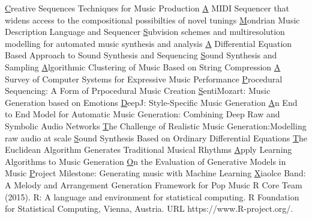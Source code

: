 \begin{frame}[t]
\begin{columns}[t]
\begin{column}{\onecolwid}
\begin{thebibliography}{00}
\footnotesize		 
{}\href{}Creative Sequences Techniques for Music Production
\href{}A MIDI Sequencer that widens access to the compositional possibilties of novel tunings
\href{}Mondrian Music Description Language and Sequencer
\href{}Subvision schemes and multiresolution modelling for automated music synthesis and analysis
\href{}A Differential Equation Based Approach to Sound Synthesis and Sequencing
\href{}Sound Synthesis and Sampling
\href{}Algorithmic Clustering of Music Based on String Compression
\href{}A Survey of Computer Systems for Expressive Music Performance
\href{}Procedural Sequencing: A Form of Prpocedural Music Creation
\href{}SentiMozart: Music Generation based on Emotions
\href{}DeepJ: Style-Specific Music Generation
\href{}An End to End Model for Automatic Music Generation: Combining Deep Raw and Symbolic Audio Networks
\href{}The Challenge of Realistic Music Generation:Modelling raw audio at scale
\href{}Sound Synthesis Based on Ordinary Differential Equations
\href{}The Euclidean Algorithm Generates Traditional Musical Rhythms
\href{}Apply Learning Algorithms to Music Generation
\href{}On the Evaluation of Generative Models in Music
\href{}Project Milestone: Generating music with Machine Learning
\href{}Xiaolce Band: A Melody and Arrangement Generation Framework for Pop Music
R Core Team (2015). 
\newblock R: A language and environment for statistical computing. R Foundation for Statistical Computing, Vienna, Austria.
\newblock URL https://www.R-project.org/.		
\end{thebibliography}
\end{column}
\end{columns}
\end{frame}

